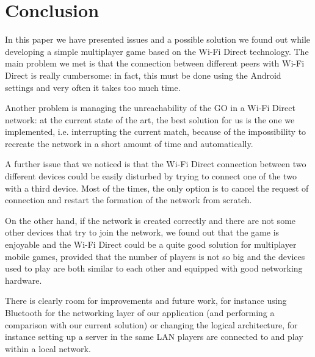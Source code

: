 \section{Conclusion}
In this paper we have presented issues and a possible solution we
found out while developing a simple multiplayer game based on the Wi-Fi Direct
technology. The main problem we met is that the connection between
different peers with Wi-Fi Direct is really cumbersome: in fact, this must be
done using the Android settings and very often it takes too much time.

Another problem is managing the unreachability of the GO in a Wi-Fi Direct
network: at the current state of the art, the best solution for us is the one
we implemented, i.e. interrupting the current match, because of the
impossibility to recreate the network in a short amount of time and
automatically.

A further issue that we noticed is that the Wi-Fi Direct connection
between two different devices could be easily disturbed by trying to connect
one of the two with a third device. Most of the times, the only option is to
cancel the request of connection and restart the formation of the network from
scratch.

On the other hand, if the network is created correctly and there are not
some other devices that try to join the network, we found out that the game
is enjoyable and the Wi-Fi Direct could be a quite good solution for
multiplayer mobile games, provided that the number of players is not so big and
the devices used to play are both similar to each other and equipped with good
networking hardware.

There is clearly room for improvements and future work, for instance
using Bluetooth for the networking layer of our application (and performing a
comparison with our current solution) or changing the logical architecture, for
instance setting up a server in the same LAN players are connected to and
play within a local network.